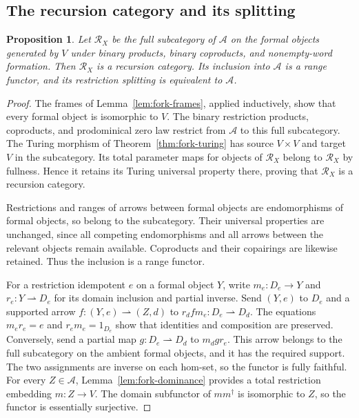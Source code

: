 \documentclass[11pt]{article}
\newtheorem{proposition}[theorem]{Proposition}
\begin{document}
\subsection{The recursion category and its splitting}

\begin{proposition}\label{prop:fork-recursion}
Let $\mathscr R_X$ be the full subcategory of
$\mathcal A$ on the formal objects generated by $V$ under
binary products, binary coproducts, and nonempty-word formation.
Then $\mathscr R_X$ is a recursion category. Its inclusion
into $\mathcal A$ is a range functor, and its restriction
splitting is equivalent to $\mathcal A$.
\end{proposition}
\begin{proof}
The frames of Lemma~\ref{lem:fork-frames}, applied inductively,
show that every formal object is isomorphic to $V$.
The binary restriction products, coproducts, and prodominical
zero law restrict from $\mathcal A$ to this full subcategory.
The Turing morphism of Theorem~\ref{thm:fork-turing} has
source $V\times V$ and target $V$ in the subcategory.
Its total parameter maps for objects of $\mathscr R_X$ belong
to $\mathscr R_X$ by fullness. Hence it retains its Turing
universal property there, proving that $\mathscr R_X$ is a
recursion category.

Restrictions and ranges of arrows between formal objects are
endomorphisms of formal objects, so belong to the subcategory.
Their universal properties are unchanged, since all competing
endomorphisms and all arrows between the relevant objects remain
available. Coproducts and their copairings are likewise retained.
Thus the inclusion is a range functor.

For a restriction idempotent $e$ on a formal object $Y$, write
$m_e:D_e\to Y$ and $r_e:Y\rightharpoonup D_e$ for its
domain inclusion and partial inverse. Send $(Y,e)$ to $D_e$
and a supported arrow $f:(Y,e)\rightharpoonup(Z,d)$ to
$r_d f m_e:D_e\rightharpoonup D_d$.
The equations $m_er_e=e$ and $r_em_e=1_{D_e}$ show that
identities and composition are preserved. Conversely, send a
partial map $g:D_e\rightharpoonup D_d$ to $m_d g r_e$.
This arrow belongs to the full subcategory on the ambient
formal objects, and it has the required support. The two
assignments are inverse on each hom-set, so the functor is
fully faithful.
For every $Z\in\mathcal A$, Lemma~\ref{lem:fork-dominance}
provides a total restriction embedding $m:Z\to V$.
The domain subfunctor of $mm^\dagger$ is isomorphic to $Z$,
so the functor is essentially surjective.
\end{proof}
\end{document}
